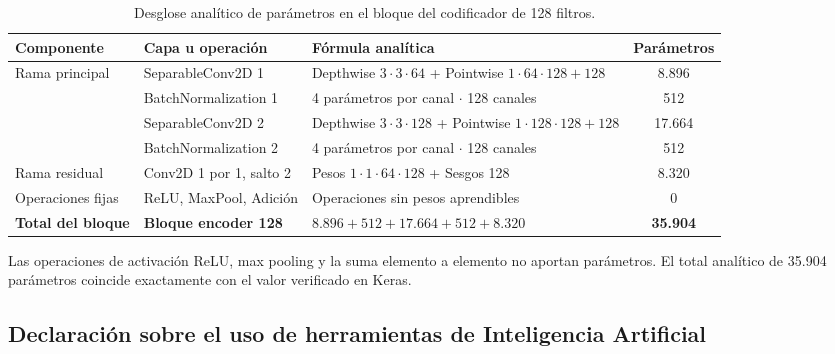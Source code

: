 \documentclass[10pt,letterpaper]{article}
\begin{document}
\begin{table}[H]
    \centering
    \small
    \caption{Desglose analítico de parámetros en el bloque del codificador de 128 filtros.}
    \label{tab_desglose_encoder}
    \begin{tabular}{lllc}
        \toprule
        \textbf{Componente}       & \textbf{Capa u operación}   & \textbf{Fórmula analítica}                                                & \textbf{Parámetros} \\
        \midrule
        Rama principal            & SeparableConv2D 1           & Depthwise $3 \cdot 3 \cdot 64$ + Pointwise $1 \cdot 64 \cdot 128 + 128$   & 8.896               \\
                                  & BatchNormalization 1        & 4 parámetros por canal $\cdot$ 128 canales                                & 512                 \\
                                  & SeparableConv2D 2           & Depthwise $3 \cdot 3 \cdot 128$ + Pointwise $1 \cdot 128 \cdot 128 + 128$ & 17.664              \\
                                  & BatchNormalization 2        & 4 parámetros por canal $\cdot$ 128 canales                                & 512                 \\
        \midrule
        Rama residual             & Conv2D 1 por 1, salto 2     & Pesos $1 \cdot 1 \cdot 64 \cdot 128$ + Sesgos 128                         & 8.320               \\
        \midrule
        Operaciones fijas         & ReLU, MaxPool, Adición      & Operaciones sin pesos aprendibles                                         & 0                   \\
        \midrule
        \textbf{Total del bloque} & \textbf{Bloque encoder 128} & $8.896 + 512 + 17.664 + 512 + 8.320$                                      & \textbf{35.904}     \\
        \bottomrule
    \end{tabular}
\end{table}

Las operaciones de activación ReLU, max pooling y la suma elemento a elemento no aportan parámetros. El total analítico de 35.904 parámetros coincide exactamente con el valor verificado en Keras.

\vspace{0.6cm}
\subsection*{Declaración sobre el uso de herramientas de Inteligencia Artificial}\label{sec_declaracion_ia}
\end{document}
